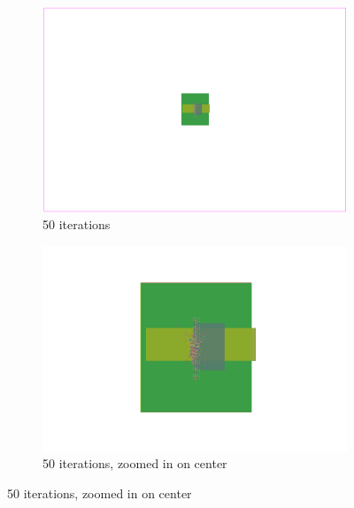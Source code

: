 \begin{figure}[p]
 \centering

 \begin{subfigure}{.48\textwidth}
  \includegraphics[width=\textwidth]{epsilon/placement_Chip2_50_iterations.png}
  \caption{50 iterations}
 \end{subfigure}
 \hfill
 \begin{subfigure}{.48\textwidth}
  \includegraphics[width=\textwidth, frame]{epsilon/placement_Chip2_50_iterations_zoomed.png}
  \caption{50 iterations, zoomed in on center}
 \end{subfigure}
 
 \bigskip
 

\end{figure}
